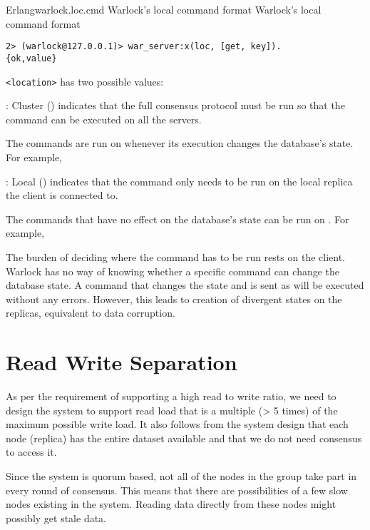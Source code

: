 \begin{scode}{Erlang}{warlock.loc.cmd}{%
  Warlock's local command format}{%
  Warlock's local command format}
  \begin{lstlisting}
2> (warlock@127.0.0.1)> war_server:x(loc, [get, key]).
{ok,value}
  \end{lstlisting}
\end{scode}

\texttt{<location>} has two possible values:

\begin{itemize}
    : Cluster () indicates that the full
    consensus protocol must be run so that the command can be executed
    on all the servers.

    The commands are run on  whenever its execution changes
    the database's state. For example, 

    : Local () indicates that the command only
    needs to be run on the local replica the client is connected to.

    The commands that have no effect on the database's state can be run
    on . For example, 
\end{itemize}

The burden of deciding where the command has to be run rests on the client.
Warlock has no way of knowing whether a specific command can change the
database state. A
command that changes the state and is sent as  will be executed
without any errors. However, this leads to creation of divergent states
on the replicas, equivalent to data corruption.

\section{Read Write Separation}

As per the requirement  of supporting a high
read to write ratio, we need to design the
system to support read load that is a multiple (> 5 times)
of the maximum possible write
load. It also follows from the system design that each node (replica) has the
entire dataset available and that we do not need consensus to access it.

Since the system is quorum based, not all of the nodes in the group take part
in every round of consensus. This means that there are possibilities of a few
slow nodes existing in the system. Reading data directly from these nodes might
possibly get stale data.

